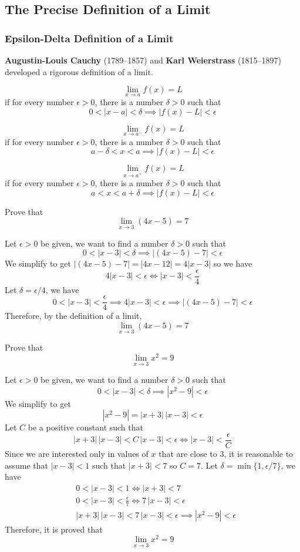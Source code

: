 \subsection{The Precise Definition of a Limit}

\subsubsection{Epsilon-Delta Definition of a Limit}
\textbf{Augustin-Louis Cauchy} (1789--1857) and \textbf{Karl Weierstrass}
(1815--1897) developed a rigorous definition of a limit.
\begin{definition}
    \[\lim_{x\to a}f(x)=L\] if for every number \(\epsilon>0\), there is a
    number \(\delta>0\) such that \[0<|x-a|<\delta\implies|f(x)-L|<\epsilon\]
\end{definition}
\begin{definition}
    \[\lim_{x\to a^-}f(x)=L\] if for every number \(\epsilon>0\), there is a
    number \(\delta>0\) such that \[a-\delta<x<a\implies|f(x)-L|<\epsilon\]
\end{definition}
\begin{definition}
    \[\lim_{x\to a^+}f(x)=L\] if for every number \(\epsilon>0\), there is a
    number \(\delta>0\) such that \[a<x<a+\delta\implies|f(x)-L|<\epsilon\]
\end{definition}
\begin{problem}
    Prove that \[\lim_{x\to 3}(4x-5)=7\]
\end{problem}
\begin{solution}
    Let \(\epsilon>0\) be given, we want to find a number \(\delta>0\) such
    that \[0<|x-3|<\delta \implies |(4x-5)-7|<\epsilon\]
    We simplify to get \(|(4x-5)-7|=|4x-12|=4|x-3|\) so we have
    \[4|x-3|<\epsilon \iff |x-3|<\frac{\epsilon}{4}\]
    Let \(\delta=\epsilon/4\), we have
    \[0<|x-3|<\frac{\epsilon}{4} \implies 4|x-3|<\epsilon \implies
    |(4x-5)-7|<\epsilon\]
    Therefore, by the definition of a limit, \[\lim_{x\to 3}(4x-5)=7\]
\end{solution}
\begin{problem}
    Prove that \[\lim_{x\to 3}x^2=9\]
\end{problem}
\begin{solution}
    Let \(\epsilon>0\) be given, we want to find a number \(\delta>0\) such
    that \[0<|x-3|<\delta \implies |x^2-9|<\epsilon\]
    We simplify to get \[|x^2-9|=|x+3|\,|x-3|<\epsilon\]
    Let \(C\) be a positive constant such that
    \[|x+3|\,|x-3|<C\,|x-3|<\epsilon \iff |x-3|<\frac{\epsilon}{C}\]
    Since we are interested only in values of \(x\) that are close to 3, it is
    reasonable to assume that \(|x-3|<1\) such that \(|x+3|<7\) so \(C=7\).
    Let \(\delta=\min\{1,\epsilon/7\}\), we have
    \begin{align*}
        &0<|x-3|<1 \iff |x+3|<7 \\ &0<|x-3|<\frac{\epsilon}{7} \iff
        7\,|x-3|<\epsilon \\ &|x+3|\,|x-3|<7\,|x-3|<\epsilon \implies
        |x^2-9|<\epsilon
    \end{align*}
    Therefore, it is proved that \[\lim_{x\to 3}x^2=9\]
\end{solution}
